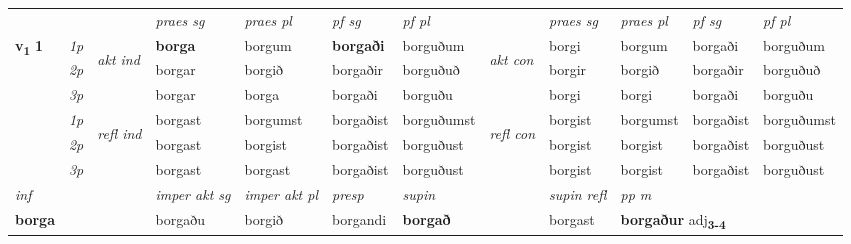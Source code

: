 
\begin{longtable}[l]{X>{\footnotesize\itshape}llXXXXlXXXX} \toprule
 & &   & \textit{praes sg}  & \textit{praes pl}    & \textit{ pf sg} & \textit{pf pl} & & \textit{praes sg}  & \textit{praes pl}    & \textit{pf sg} & \textit{pf pl }  \\ \cmidrule{4-7} \cmidrule{9-12}
 \multirow{2}{*}{{{\textbf{v{\textsubscript{1}}} \Large{\textbf{1}}}}}  & 1p & \multirow{3}{*}{\begin{turn}{90}\textit{akt ind}\end{turn}} & \textbf{borga} & borgum & \textbf{borgaði} & borguðum & \multirow{3}{*}{\begin{turn}{90}\textit{akt con}\end{turn}} &borgi & borgum & borgaði & borguðum\\*
 & 2p &  &  borgar  & borgið & borgaðir & borguðuð & & borgir & borgið & borgaðir & borguðuð \\*
 & 3p &  & borgar & borga & borgaði & borguðu & & borgi & borgi& borgaði & borguðu \\*
\cmidrule{4-7} \cmidrule{9-12}
 & 1p & \multirow{3}{*}{\begin{turn}{90}\textit{refl ind}\end{turn}}  & borgast & borgumst & borgaðist & borguðumst & \multirow{3}{*}{\begin{turn}{90}\textit{refl con}\end{turn}}  &borgist & borgumst & borgaðist & borguðumst \\*
 & 2p &  & borgast & borgist & borgaðist & borguðust & &borgist & borgist & borgaðist & borguðust \\*
 & 3p  & & borgast & borgast & borgaðist & borguðust & & borgist & borgist& borgaðist & borguðust \\*
\cmidrule{4-7} \cmidrule{9-12}

   {\textit{inf}} & &  & \textit{imper akt sg} & \textit{imper akt pl}   & \textit{presp} & \textit{supin} && \textit{supin refl} & \textit{pp m} \\*
  {\textbf{borga}} & && borgaðu  & borgið   & borgandi &  \textbf{borgað} && borgast & \multicolumn{2}{l}{\textbf{borgaður} adj\textbf{\textsubscript{3-4}}} \\*

\midrule


\end{longtable}
